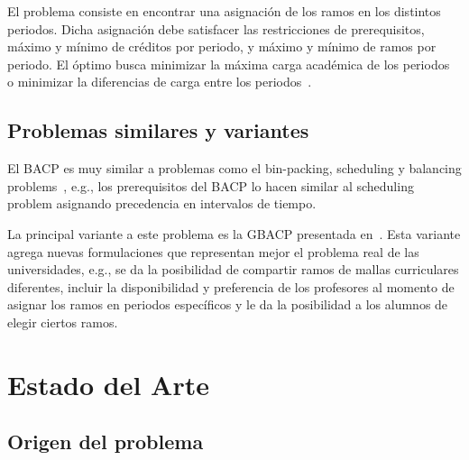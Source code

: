\documentclass[letterpaper,10pt]{article}
\begin{document}
El problema consiste en encontrar una asignación de los ramos en los distintos periodos. Dicha asignación debe satisfacer las restricciones de prerequisitos, máximo y mínimo de créditos por periodo, y máximo y mínimo de ramos por periodo.
El óptimo busca minimizar la máxima carga académica de los periodos~\cite{DBLP:journals/corr/cs-PL-0110007} o minimizar la diferencias de carga entre los periodos~\cite{Monette07acp}.

\subsection{Problemas similares y variantes}

El BACP es muy similar a problemas como el bin-packing, scheduling y balancing problems~\cite{Monette07acp}, e.g., los prerequisitos del BACP lo hacen similar al scheduling problem asignando precedencia en intervalos de tiempo.

La principal variante a este problema es la GBACP presentada en~\cite{GbacpGaspero}. Esta variante agrega nuevas formulaciones que representan mejor el problema real de las universidades, e.g., se da la posibilidad de compartir ramos de mallas curriculares diferentes, incluir la disponibilidad y preferencia de los profesores al momento de asignar los ramos en periodos específicos y le da la posibilidad a los alumnos de elegir ciertos ramos.

\section{Estado del Arte}

\subsection{Origen del problema}
\end{document}
